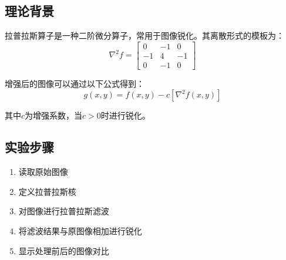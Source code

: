 \documentclass[a4paper]{article}
\begin{document}
\subsection{理论背景}

拉普拉斯算子是一种二阶微分算子，常用于图像锐化。其离散形式的模板为：
\begin{equation}
\nabla^2 f = \begin{bmatrix}
0 & -1 & 0 \\
-1 & 4 & -1 \\
0 & -1 & 0
\end{bmatrix}
\end{equation}

增强后的图像可以通过以下公式得到：
\begin{equation}
g(x,y) = f(x,y) - c[\nabla^2 f(x,y)]
\end{equation}

其中$c$为增强系数，当$c > 0$时进行锐化。

\subsection{实验步骤}

\begin{enumerate}
    \item 读取原始图像
    \item 定义拉普拉斯核
    \item 对图像进行拉普拉斯滤波
    \item 将滤波结果与原图像相加进行锐化
    \item 显示处理前后的图像对比
\end{enumerate}
\end{document}
